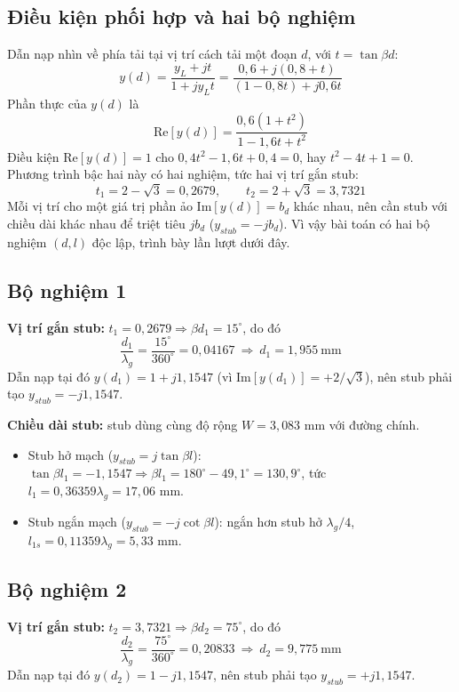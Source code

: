 \documentclass[a4paper]{report}
\begin{document}
\subsection{Điều kiện phối hợp và hai bộ nghiệm}
Dẫn nạp nhìn về phía tải tại vị trí cách tải một đoạn $d$, với $t=\tan\beta d$:
\begin{equation}
  y(d)=\frac{y_L+jt}{1+jy_Lt}=\frac{0{,}6+j(0{,}8+t)}{(1-0{,}8t)+j0{,}6t}
\end{equation}
Phần thực của $y(d)$ là
\begin{equation}
  \mathrm{Re}[y(d)]=\frac{0{,}6(1+t^2)}{1-1{,}6t+t^2}
\end{equation}
Điều kiện $\mathrm{Re}[y(d)]=1$ cho $0{,}4t^2-1{,}6t+0{,}4=0$, hay $t^2-4t+1=0$. Phương trình bậc hai này có hai nghiệm, tức hai vị trí gắn stub:
\begin{equation}
  t_{1}=2-\sqrt3=0{,}2679,\qquad t_{2}=2+\sqrt3=3{,}7321
\end{equation}
Mỗi vị trí cho một giá trị phần ảo $\mathrm{Im}[y(d)]=b_d$ khác nhau, nên cần stub với chiều dài khác nhau để triệt tiêu $jb_d$ ($y_{stub}=-jb_d$). Vì vậy bài toán có hai bộ nghiệm $(d,l)$ độc lập, trình bày lần lượt dưới đây.

\subsection{Bộ nghiệm 1}
\textbf{Vị trí gắn stub:} $t_1=0{,}2679\Rightarrow\beta d_1=15^\circ$, do đó
\begin{equation}
  \frac{d_1}{\lambda_g}=\frac{15^\circ}{360^\circ}=0{,}04167\ \Rightarrow\ d_1=1{,}955\ \text{mm}
\end{equation}
Dẫn nạp tại đó $y(d_1)=1+j1{,}1547$ (vì $\mathrm{Im}[y(d_1)]=+2/\sqrt3$), nên stub phải tạo $y_{stub}=-j1{,}1547$.

\textbf{Chiều dài stub:} stub dùng cùng độ rộng $W=3{,}083$ mm với đường chính.
\begin{itemize}
  \item Stub hở mạch ($y_{stub}=j\tan\beta l$): $\tan\beta l_1=-1{,}1547\Rightarrow\beta l_1=180^\circ-49{,}1^\circ=130{,}9^\circ$, tức $l_1=0{,}36359\lambda_g=17{,}06$ mm.
  \item Stub ngắn mạch ($y_{stub}=-j\cot\beta l$): ngắn hơn stub hở $\lambda_g/4$, $l_{1s}=0{,}11359\lambda_g=5{,}33$ mm.
\end{itemize}

\subsection{Bộ nghiệm 2}
\textbf{Vị trí gắn stub:} $t_2=3{,}7321\Rightarrow\beta d_2=75^\circ$, do đó
\begin{equation}
  \frac{d_2}{\lambda_g}=\frac{75^\circ}{360^\circ}=0{,}20833\ \Rightarrow\ d_2=9{,}775\ \text{mm}
\end{equation}
Dẫn nạp tại đó $y(d_2)=1-j1{,}1547$, nên stub phải tạo $y_{stub}=+j1{,}1547$.
\end{document}
